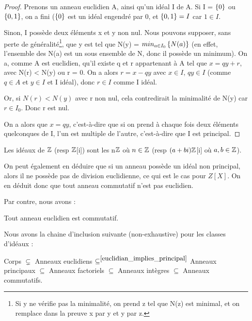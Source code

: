 \ifdefined\outputproof
\begin{proof}
	Prenons un anneau euclidien A, ainsi qu'un idéal I de A. Si I = $\left\{ 0 \right\}$
	ou $\left\{ 0, 1 \right\}$, on a fini ($\left\{ 0 \right\}$ est un idéal engendré par 0, et
	$\left\{ 0, 1 \right\} = I$ car $1 \in I$.

	Sinon, I possède deux éléments x et y non nul. Nous pouvons supposer, sans
	perte de généralité\footnote{Si y ne vérifie pas la minimalité, on prend z
	tel que N(z) est minimal, et on remplace dans la preuve x par y et y par
z.}, que y est tel que N(y) = $\displaystyle min_{a \in I_{0}} \left\{ N(a) \right\}$ (en
effet, l'ensemble des N(a) est un sous ensemble de N, donc il possède un
minimum).  On a, comme A est euclidien, qu'il existe q et r appartenant à A tel
que $x
	= qy + r$, avec N(r) < N(y) ou r = 0.
	On a alors $r = x - qy$ avec $x \in I$, $qy \in I$ (comme $q \in A$ et $y
	\in I$ et I idéal), donc $r \in I$ comme I idéal.

	Or, si $N(r) < N(y)$ avec r non nul, cela contredirait la minimalité de N(y)
	car $r \in I_{0}$. Donc r est nul.

	On a alors que $x = qy$, c'est-à-dire que si on prend à chaque fois deux
	éléments quelconques de I, l'un est multiple de l'autre, c'est-à-dire que
	I est principal.
\end{proof}
\fi

\begin{corollary}
	Les idéaux de $\mathbb{Z}$ (resp $\mathbb{Z}$[i]) sont les n$\mathbb{Z}$ où $n \in
	\mathbb{Z}$ (resp $(a+bi) \mathbb{Z}$[i] où $a, b \in \mathbb{Z}$).
\end{corollary}

On peut également en déduire que si un anneau possède un idéal non principal,
alors il ne possède pas de division euclidienne, ce qui est le cas pour $Z[X]$.
On en déduit donc que tout anneau commutatif n'est pas euclidien.

Par contre, nous avons :
\begin{proposition}
	Tout anneau euclidien est commutatif.
\end{proposition}

Nous avons la chaine d'inclusion suivante (non-exhaustive) pour les classes
d'idéaux :
\begin{theorem}
	Corps
	$\displaystyle \subsetneq$ Anneaux euclidiens
	$\displaystyle \subseteq^{\ref{euclidian_implies_principal}}$ Anneaux principaux
	$\subseteq$ Anneaux factoriels $\subseteq$ Anneaux intègres $\subseteq$
	Anneaux commutatifs.
	\label{ideal_class}
\end{theorem}

